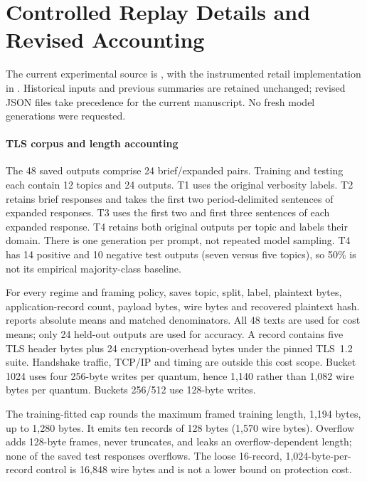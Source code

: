 \section{Controlled Replay Details and Revised Accounting}\label{app:controlled-details}
The current experimental source is , with the instrumented retail implementation in . Historical inputs and previous summaries are retained unchanged; revised JSON files take precedence for the current manuscript. No fresh model generations were requested.

\paragraph{TLS corpus and length accounting}
The 48 saved outputs comprise 24 brief/expanded pairs. Training and testing each contain 12 topics and 24 outputs. T1 uses the original verbosity labels. T2 retains brief responses and takes the first two period-delimited sentences of expanded responses. T3 uses the first two and first three sentences of each expanded response. T4 retains both original outputs per topic and labels their domain. There is one generation per prompt, not repeated model sampling. T4 has 14 positive and 10 negative test outputs (seven versus five topics), so 50\% is not its empirical majority-class baseline.

For every regime and framing policy,  saves topic, split, label, plaintext bytes, application-record count, payload bytes, wire bytes and recovered plaintext hash.  reports absolute means and matched denominators. All 48 texts are used for cost means; only 24 held-out outputs are used for accuracy. A record contains five TLS header bytes plus 24 encryption-overhead bytes under the pinned TLS~1.2 suite. Handshake traffic, TCP/IP and timing are outside this cost scope. Bucket 1024 uses four 256-byte writes per quantum, hence 1,140 rather than 1,082 wire bytes per quantum. Buckets 256/512 use 128-byte writes.

The training-fitted cap rounds the maximum framed training length, 1,194 bytes, up to 1,280 bytes. It emits ten records of 128 bytes (1,570 wire bytes). Overflow adds 128-byte frames, never truncates, and leaks an overflow-dependent length; none of the saved test responses overflows. The loose 16-record, 1,024-byte-per-record control is 16,848 wire bytes and is not a lower bound on protection cost.

